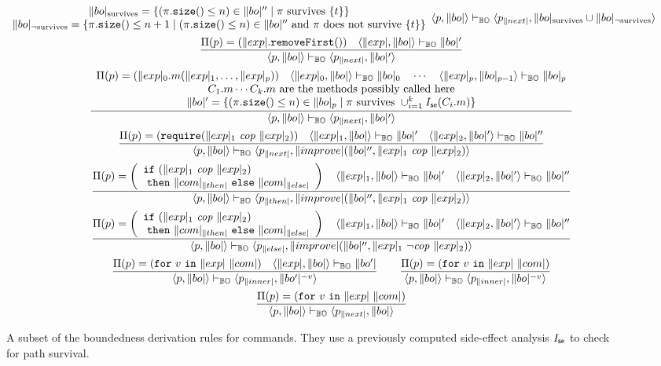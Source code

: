 \begin{definition}
\begin{figure}[t]
\begin{gather*}
{\begin{array}{c}
          \|bo|_{\text{survives}}=\{(\size{\pi}\le n)\in\|bo|''\mid\pi\text{ survives }\{t\}\}\\
          \|bo|_{\neg\text{survives}}=\{\size{\pi}\le n+1\mid(\size{\pi}\le n)\in\|bo|''\text{ and }\pi\text{ does not survive }\{t\}\}
      \end{array}}{\pair{p}{\|bo|}\boderivation\pair{p_{\|next|}}{\|bo|_{\text{survives}}\cup\|bo|_{\neg\text{survives}}}}\\[1pt]
      \frac{\Pi(p)=(\removeFirst{\exp})\quad\pair{\exp}{\|bo|}\boderivation\|bo|'}
           {\pair{p}{\|bo|}\boderivation\pair{p_{\|next|}}{\|bo|'}}\\[1pt]
      \frac{\begin{array}{c}
          \Pi(p)=(\call{\exp_0}{m}{\exp_1,\ldots,\exp_p})\quad\pair{\exp_0}{\|bo|}\boderivation\|bo|_0\quad\cdots\quad\pair{\exp_p}{\|bo|_{p-1}}\boderivation\|bo|_p\\
          \text{$C_1.m\cdots C_k.m$ are the methods possibly called here}\\
          \|bo|'=\{(\size{\pi}\le n)\in\|bo|_p\mid\pi\text{ survives }\cup_{i=1}^k\intsideeffect(C_i.m)\}
      \end{array}}{\pair{p}{\|bo|}\boderivation\pair{p_{\|next|}}{\|bo|'}}\\[1pt]
      \frac{\Pi(p)=(\require{\exp_1}{\exp_2})\quad\pair{\exp_1}{\|bo|}\boderivation\|bo|'\quad\pair{\exp_2}{\|bo|'}\boderivation\|bo|''}{\pair{p}{\|bo|}\boderivation{\pair{p_{\|next|}}{\|improve|(\|bo|'',\cop{\exp_1}{\exp_2})}}}\\[1pt]
      \frac{\Pi(p)=\left(\ifetwo{\exp_1}{\exp_2}{\com_{\|then|}}{\com_{\|else|}}\right)\quad\pair{\exp_1}{\|bo|}\boderivation\|bo|'\quad\pair{\exp_2}{\|bo|'}\boderivation\|bo|''}{\pair{p}{\|bo|}\boderivation\pair{p_{\|then|}}{\|improve|(\|bo|'',\cop{\exp_1}{\exp_2})}}\\[1pt]
      \frac{\Pi(p)=\left(\ifetwo{\exp_1}{\exp_2}{\com_{\|then|}}{\com_{\|else|}}\right)\quad\pair{\exp_1}{\|bo|}\boderivation\|bo|'\quad\pair{\exp_2}{\|bo|'}\boderivation\|bo|''}{\pair{p}{\|bo|}\boderivation\pair{p_{\|else|}}{\|improve|(\|bo|'',\negcop{\exp_1}{\exp_2})}}\\[1pt]
      \frac{\Pi(p)=(\for{v}{\exp}{\com})\quad\pair{\exp}{\|bo|}\boderivation\|bo'|}
           {\pair{p}{\|bo|}\boderivation\pair{p_{\|inner|}}{\|bo'|^{-v}}}\qquad
      \frac{\Pi(p)=(\for{v}{\exp}{\com})}
           {\pair{p}{\|bo|}\boderivation\pair{p_{\|inner|}}{\|bo|^{-v}}}\\[1pt]
      \frac{\Pi(p)=(\for{v}{\exp}{\com})}
           {\pair{p}{\|bo|}\boderivation\pair{p_{\|next|}}{\|bo|}}
    \end{gather*}
    \caption{A subset of the boundedness derivation rules for commands. They use
      a previously computed side-effect analysis $I_{\mathsf{se}}$ to check for path survival.}
    \label{fig:bo_derivations_commands}
  \end{figure}
\end{definition}
